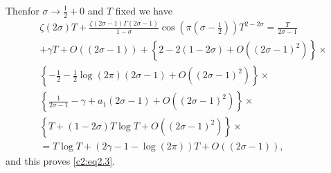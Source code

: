 
Then\pageoriginale for $\sigma \to \frac{1}{2} + 0$ and $T$ fixed we have
\begin{align*}
& \zeta (2 \sigma)  T  + \frac{\zeta(2 \sigma -1) \Gamma (2 \sigma
    -1)}{1- \sigma} \cos (\pi (\sigma - \frac{1}{2}))T^{2- 2 \sigma}= \frac{T}{2 \sigma-1}\\
  &  + \gamma T + O ((2 \sigma -1))
   + \left\{2- 2 (1- 2 \sigma) + O ((2 \sigma -1)^2) \right\}\times\\
  & \left\{- \frac{1}{2} - \frac{1}{2}\log (2 \pi) (2
   \sigma -1)+ O ((2   \sigma-1)^2)  \right\} \times \\
  & \left\{ \frac{1}{2 \sigma-1} - \gamma + a_1 (2
  \sigma -1)+ O ((2 \sigma -1)^2)\right\}\times\\ 
  & \left\{T + (1- 2 \sigma) T \log T + O (( 2
  \sigma -1)^2)\right\}\times\\
  & = T \log T + (2 \gamma -1 - \log (2 \pi)) T + O ((2 \sigma-1)),
\end{align*}
and this proves \eqref{c2:eq2.3}.

